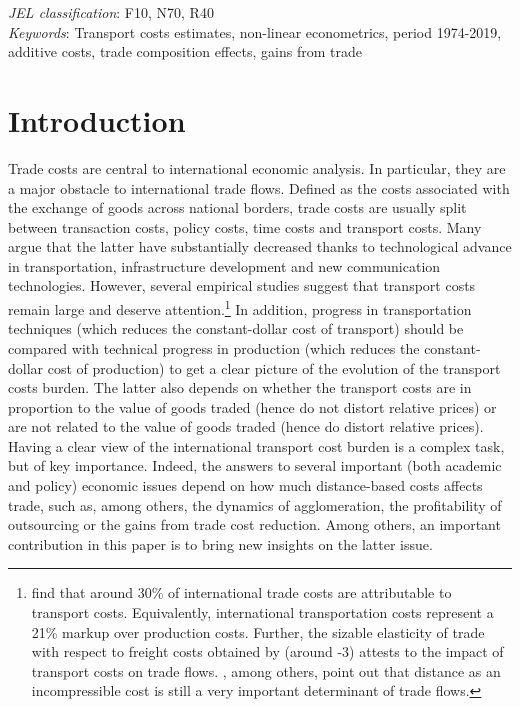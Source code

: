 \documentclass[a4paper,11pt]{article}
\begin{document}
\thispagestyle{empty} \pagestyle{plain} \setcounter{page}{1}

\bigskip


\noindent \emph{JEL classification}: F10, N70, R40 \\
\noindent \emph{Keywords}: Transport costs estimates, non-linear econometrics, period 1974-2019, additive costs, trade composition effects, gains from trade

{\normalsize \vspace{0cm} }

{\normalsize \titlepage }

{\normalsize \newpage }


\section{Introduction \label{sec:Intro}}


Trade costs are central to international economic analysis. In particular, they are a major obstacle to international trade flows. Defined as the costs associated with the exchange of goods across national borders, trade costs are usually split between transaction costs, policy costs, time costs and transport costs. Many argue that the latter have substantially decreased thanks to technological advance in transportation, infrastructure development and new communication technologies.
However, several empirical studies suggest that transport costs remain large and deserve attention.\footnote{\cite{anderson_wincoop_jel} find that around 30\% of international trade costs are attributable to transport costs. Equivalently, international transportation costs represent a 21\% markup over production costs. Further, the sizable elasticity of trade with respect to freight costs obtained by \cite{Behar_Venables} (around -3) attests to the impact of transport costs on trade flows. \cite{Disdier_Head08}, among others, point out that distance as an incompressible cost is still a very important determinant of trade flows.} In addition, progress in transportation techniques (which reduces the constant-dollar cost of transport) should be compared with technical progress in production (which reduces the constant-dollar cost of production) to get a clear picture of the evolution
of the transport costs burden. The latter also depends on whether the transport costs are in proportion to the value of goods traded (hence do not distort relative prices) or are not related to the value of goods traded (hence do distort relative prices). Having a clear view of the international transport cost burden is a complex task, but of key importance. Indeed, the answers to several important (both academic and policy) economic issues depend on how much distance-based costs affects trade, such as, among others, the dynamics of agglomeration, the profitability of outsourcing or the gains from trade cost reduction. Among others, an important contribution in this paper is to bring new insights on the latter issue.\smallskip
\end{document}
